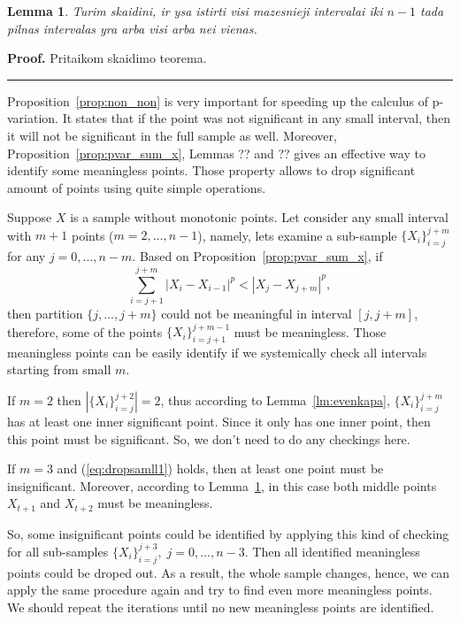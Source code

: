 \documentclass[12pt, a4paper]{article}
\newtheorem{lemma}[theorem]{Lemma}
\newenvironment{proof}[1][Proof]{\noindent \textbf{#1.} }{\  \rule{0.5em}{0.5em}}
\numberwithin{equation}{section}
\begin{document}
\begin{lemma}\label{lm:samllincrease}
Turim skaidini, ir ysa istirti visi mazesnieji intervalai iki $n-1$
tada pilnas intervalas yra arba visi arba nei vienas.

\end{lemma}
\begin{proof}
Pritaikom skaidimo teorema.
\end{proof}


Proposition~\ref{prop:non_non} is very important for speeding up the calculus of p-variation. It states that if the point was not significant in any small interval, then it will not be significant in the full sample as well. Moreover, Proposition~\ref{prop:pvar_sum_x}, Lemmas ?? and ?? gives an effective 
way to identify some meaningless points.  
Those property allows to drop significant amount of points using quite simple operations.

Suppose $X$ is a sample without monotonic points. 
Let consider any small interval with $m+1$ points ($m=2,\dots,n-1$), 
namely, lets examine a sub-sample 
$\{X_{i}\}_{i=j}^{j+m}$
for any $j=0,...,n-m$.
Based on Proposition~\ref{prop:pvar_sum_x}, if 
\begin{equation}\label{eq:dropsamll1}
  \sum_{i=j+1}^{j+m} |X_{i}-X_{i-1}|^p < |X_j-X_{j+m}|^p,
\end{equation}
then partition $\{j,\dots,j+m\}$ could not be meaningful in interval
$[j,j+m]$, therefore, some of the points $\{X_{i}\}_{i=j+1}^{j+m-1}$
must be meaningless. Those meaningless points can be easily identify 
if we systemically check all intervals starting from small $m$.

If $m=2$ then $|\{X_{i}\}_{i=j}^{j+2}|=2$, thus according to
Lemma~\ref{lm:evenkapa}, $\{X_{i}\}_{i=j}^{j+m}$ has at least one
inner significant point. Since it only has one inner point, then this point must be significant. So, we don't need to do any checkings here.

If $m=3$ and (\ref{eq:dropsamll1}) holds,
then at least one 
point must be insignificant. 
Moreover, according to Lemma~\ref{lm:samllincrease}, 
in this case both middle points $X_{t+1}$ and $X_{t+2}$ 
must be meaningless. 

So, some insignificant points could be identified by 
applying this kind of checking for all sub-samples
$\{X_{i}\}_{i=j}^{j+3},\;j=0,...,n-3$. 
Then all identified meaningless points 
could be droped out.
As a result, the whole sample changes,  
hence, 
we can apply the same procedure again and try to find 
even more meaningless points. 
We should repeat the iterations 
until no new meaningless points are 
identified.
\end{document}
